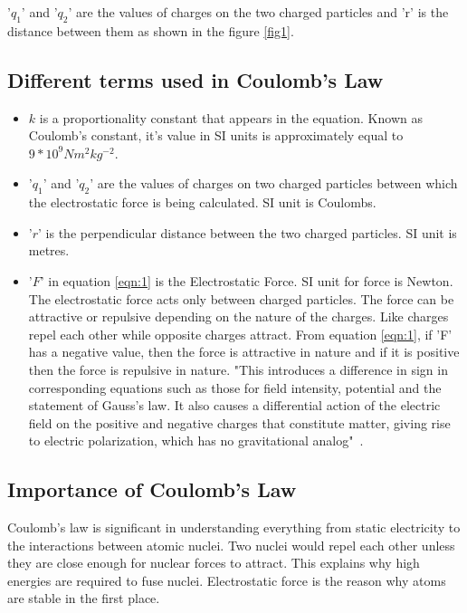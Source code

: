 \documentclass[a4paper, 12pt]{article}
\begin{document}
'$q_1$' and '$q_2$' are the values of charges on the two charged particles and 'r' is the distance between them as shown in the figure \ref{fig1}.

\subsection{Different terms used in Coulomb's Law}
\begin{itemize}

	\item $k$ is a proportionality constant that appears in the equation. Known as Coulomb's constant, it's value in SI units is approximately equal to $9*10^9 N m^{2} kg^{-2}$.
	\item '$q_1$' and '$q_2$' are the values of charges on two charged particles between which the electrostatic force is being calculated. SI unit is Coulombs.
	\item '$r$' is the perpendicular distance between the two charged particles. SI unit is metres. 
	\item '$F$' in equation \ref{eqn:1} is the Electrostatic Force. SI unit for force is Newton. The electrostatic force acts only between charged particles. The force can be attractive or repulsive depending on the nature of the charges. Like charges repel each other while opposite charges attract. From equation \ref{eqn:1}, if 'F' has a negative value, then the force is attractive in nature and if it is positive then the force is repulsive in nature. "This introduces a difference in sign in corresponding equations such as those for field intensity, potential and the statement of Gauss's law. It also causes a differential action of the electric field on the positive and negative charges that constitute matter, giving rise to electric polarization, which has no gravitational analog"~\cite{Murdock1944}.
	
\end{itemize}

\subsection{Importance of Coulomb's Law}

Coulomb's law is significant in understanding everything from static electricity to the interactions between atomic nuclei.
Two nuclei would repel each other unless they are close enough for nuclear forces to attract. This explains why high energies are required to fuse nuclei. Electrostatic force is the reason why atoms are stable in the first place.




\end{document}
